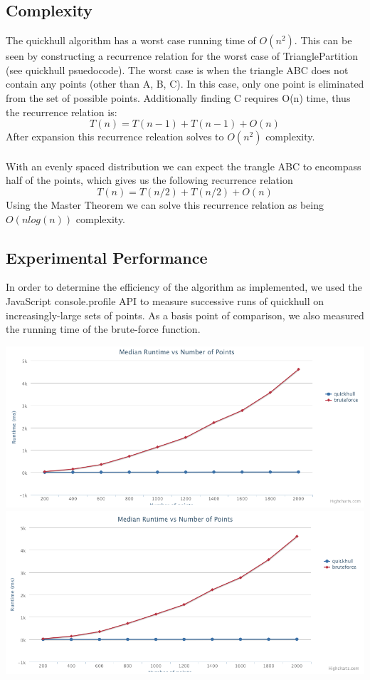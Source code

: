 \documentclass[11pt]{article}
\begin{document}
\subsection{Complexity}
The quickhull algorithm has a worst case running time of $O(n^2)$. This can be seen by constructing a recurrence relation for the worst case of TrianglePartition (see quickhull psuedocode). The worst case is when the triangle ABC does not contain any points (other than A, B, C). In this case, only one point is eliminated from the set of possible points. Additionally finding C requires O(n) time, thus the recurrence relation is:
\[ T(n) = T(n - 1) + T(n - 1) + O(n) \]
After expansion this recurrence releation solves to $O(n^2)$ complexity.
\\
\\
With an evenly spaced distribution we can expect the trangle ABC to encompass half of the points, which gives us the following recurrence relation
\[ T(n) = T(n / 2) + T(n / 2) + O(n) \]
Using the Master Theorem we can solve this recurrence relation as being $O(n log(n))$ complexity.

\subsection{Experimental Performance}
In order to determine the efficiency of the algorithm as implemented, we used the JavaScript console.profile API to measure successive runs of quickhull on increasingly-large sets of points. As a basis point of comparison, we also measured the running time of the brute-force function.

\includegraphics[scale=0.3]{quickhull - raphael-cloud.png} 
\includegraphics[scale=0.3]{quickhull - raphael-circle.png} 
\end{document}
